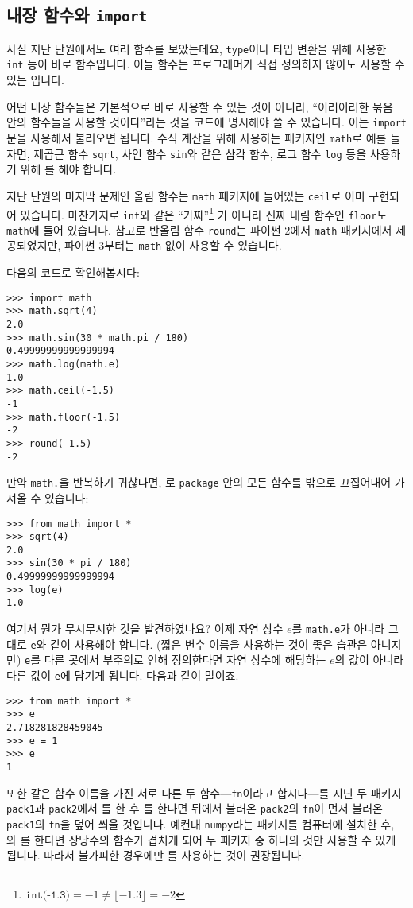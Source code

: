 \documentclass[../main.tex]{subfiles}
\begin{document}
\subsection{내장 함수와 \texttt{import}}
사실 지난 단원에서도 여러 함수를 보았는데요, \verb/type/이나 타입 변환을 위해 사용한
\verb/int/ 등이 바로 함수입니다.
이들 함수는 프로그래머가 직접 정의하지 않아도 사용할 수 있는 입니다.

어떤 내장 함수들은 기본적으로 바로 사용할 수 있는 것이 아니라, ``이러이러한 묶음 안의 함수들을 사용할 것이다''라는 것을 코드에 명시해야 쓸 수 있습니다.
이는 \verb/import/문을 사용해서 불러오면 됩니다.
수식 계산을 위해 사용하는 패키지인 \texttt{math}로 예를 들자면, 제곱근 함수
\verb/sqrt/, 사인 함수 \verb/sin/와 같은 삼각
함수, 로그 함수 \verb/log/ 등을 사용하기 위해 를 해야 합니다.

지난 단원의 마지막 문제인 올림 함수는 \verb|math|
패키지에 들어있는  \verb/ceil/로 이미 구현되어 있습니다.
마찬가지로 \texttt{int}와 같은 ``가짜''\footnote{$\texttt{int(-1.3)} = -1 \ne \lfloor-1.3\rfloor = -2$} 가 아니라 진짜 내림 함수인 \verb/floor/도 \verb/math/에 들어 있습니다.
참고로 반올림 함수 \verb/round/는 파이썬 2에서 \verb|math| 패키지에서 제공되었지만, 파이썬 3부터는 \verb/math/ 없이 사용할 수 있습니다.

다음의 코드로 확인해봅시다:
\begin{verbatim}
>>> import math
>>> math.sqrt(4)
2.0
>>> math.sin(30 * math.pi / 180)
0.49999999999999994
>>> math.log(math.e)
1.0
>>> math.ceil(-1.5)
-1
>>> math.floor(-1.5)
-2
>>> round(-1.5)
-2
\end{verbatim}

만약 \texttt{math.}을 반복하기 귀찮다면, 로 \verb/package/ 안의 모든 함수를 밖으로 끄집어내어 가져올 수 있습니다:
\begin{verbatim}
>>> from math import *
>>> sqrt(4)
2.0
>>> sin(30 * pi / 180)
0.49999999999999994
>>> log(e)
1.0
\end{verbatim}
여기서 뭔가 무시무시한 것을 발견하였나요?
이제 자연 상수 $e$를 \verb/math.e/가 아니라 그대로 \verb/e/와 같이 사용해야 합니다.
(짧은 변수 이름을 사용하는 것이 좋은 습관은 아니지만) \verb/e/를 다른 곳에서 부주의로 인해 정의한다면 자연 상수에 해당하는 $e$의 값이 아니라 다른 값이 \verb/e/에 담기게 됩니다.
다음과 같이 말이죠.
\begin{verbatim}
>>> from math import *
>>> e
2.718281828459045
>>> e = 1
>>> e
1
\end{verbatim}
또한 같은 함수 이름을 가진 서로 다른 두 함수---\texttt{fn}이라고 합시다---를 지닌 두 패키지 \texttt{pack1}과
\texttt{pack2}에서 를 한 후 를 한다면 뒤에서 불러온 \texttt{pack2}의 \texttt{fn}이 먼저 불러온
\texttt{pack1}의 \texttt{fn}을 덮어 씌울 것입니다.  예컨대 \texttt{numpy}라는
패키지를 컴퓨터에 설치한 후, 와 를 한다면 상당수의 함수가 겹치게 되어 두 패키지 중 하나의 것만 사용할 수 있게 됩니다.
따라서 불가피한 경우에만 를 사용하는 것이 권장됩니다.
\end{document}
